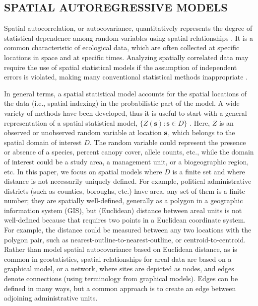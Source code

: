 \documentclass[11pt, titlepage]{article}\usepackage[]{graphicx}\usepackage[]{color}
\begin{document}
\begin{spacing}{1.9}
\begin{flushleft}
\section*{SPATIAL AUTOREGRESSIVE MODELS}

Spatial autocorrelation, or autocovariance, quantitatively represents the degree of statistical dependence among random variables using spatial relationships \citep{Cres:stat:1993}. It is a common characteristic of ecological data, which are often collected at specific locations in space and at specific times.  Analyzing spatially correlated data may require the use of spatial statistical models if the assumption of independent errors is violated, making many conventional statistical methods inappropriate \citep{Clif:Ord:spat:1981}.

In general terms, a spatial statistical model accounts for the spatial locations of the data (i.e., spatial indexing) in the probabilistic part of the model. A wide variety of methods have been developed, thus it is useful to start with a general representation of a spatial statistical model, $\{Z(\mathbf{s}):\mathbf{s}\in D\}$ \citep[][pg. 8]{Cres:stat:1993}. Here, $Z$ is an observed or unobserved random variable at location $\mathbf{s}$, which belongs to the spatial domain of interest $D$. The random variable could represent the presence or absence of a species, percent canopy cover, allele counts, etc., while the domain of interest could be a study area, a management unit, or a biogeographic region, etc. In this paper, we focus on spatial models where $D$ is a finite set and where distance is not necessarily uniquely defined.  For example, political administrative districts (such as counties, boroughs, etc.) have area, any set of them is a finite number; they are spatially well-defined, generally as a polygon in a geographic information system (GIS), but (Euclidean) distance between areal units is not well-defined because that requires two points in a Euclidean coordinate system. For example, the distance could be measured between any two locations with the polygon pair, such as nearest-outline-to-nearest-outline, or centroid-to-centroid. Rather than model spatial autocovariance based on Euclidean distance, as is common in geostatistics, spatial relationships for areal data are based on a graphical model, or a network, where sites are depicted as nodes, and edges denote connections (using terminology from graphical models).  Edges can be defined in many ways, but a common approach is to create an edge between adjoining administrative units.


\end{flushleft}
\end{spacing}
\end{document}
